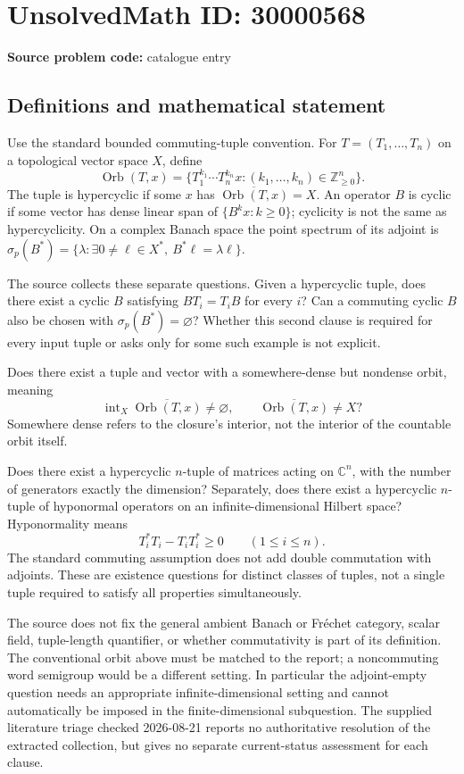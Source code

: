 \documentclass[11pt]{article}
\newcommand{\Z}{\mathbb{Z}}
\newcommand{\C}{\mathbb{C}}
\begin{document}
\section*{UnsolvedMath ID: 30000568}
\textbf{Source problem code:} catalogue entry
\subsection{Definitions and mathematical statement}
Use the standard bounded commuting-tuple convention. For \(T=(T_1,\ldots,T_n)\) on a topological vector space \(X\), define
\[
\operatorname{Orb}(T,x)=\{T_1^{k_1}\cdots T_n^{k_n}x:(k_1,\ldots,k_n)\in\Z_{\geq0}^n\}.
\]
The tuple is hypercyclic if some \(x\) has \(\overline{\operatorname{Orb}(T,x)}=X\). An operator \(B\) is cyclic if some vector has dense linear span of \(\{B^kx:k\geq0\}\); cyclicity is not the same as hypercyclicity. On a complex Banach space the point spectrum of its adjoint is \(\sigma_p(B^*)=\{\lambda:\exists0\ne\ell\in X^*,\ B^*\ell=\lambda\ell\}\).

The source collects these separate questions. Given a hypercyclic tuple, does there exist a cyclic \(B\) satisfying \(BT_i=T_iB\) for every \(i\)? Can a commuting cyclic \(B\) also be chosen with \(\sigma_p(B^*)=\varnothing\)? Whether this second clause is required for every input tuple or asks only for some such example is not explicit.

Does there exist a tuple and vector with a somewhere-dense but nondense orbit, meaning
\[
\operatorname{int}_X\overline{\operatorname{Orb}(T,x)}\ne\varnothing,
\qquad\overline{\operatorname{Orb}(T,x)}\ne X?
\]
Somewhere dense refers to the closure's interior, not the interior of the countable orbit itself.

Does there exist a hypercyclic \(n\)-tuple of matrices acting on \(\C^n\), with the number of generators exactly the dimension? Separately, does there exist a hypercyclic \(n\)-tuple of hyponormal operators on an infinite-dimensional Hilbert space? Hyponormality means
\[
T_i^*T_i-T_iT_i^*\geq0\qquad(1\leq i\leq n).
\]
The standard commuting assumption does not add double commutation with adjoints. These are existence questions for distinct classes of tuples, not a single tuple required to satisfy all properties simultaneously.

The source does not fix the general ambient Banach or Fr\'echet category, scalar field, tuple-length quantifier, or whether commutativity is part of its definition. The conventional orbit above must be matched to the report; a noncommuting word semigroup would be a different setting. In particular the adjoint-empty question needs an appropriate infinite-dimensional setting and cannot automatically be imposed in the finite-dimensional subquestion. The supplied literature triage checked 2026-08-21 reports no authoritative resolution of the extracted collection, but gives no separate current-status assessment for each clause.
\end{document}
